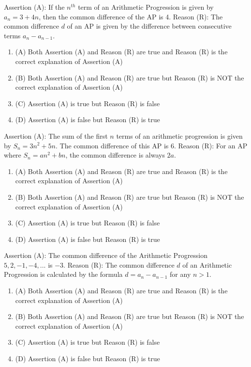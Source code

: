 \documentclass[12pt,a4paper]{exam}
\begin{document}
\begin{questions}
\question[1] Assertion (A): If the $n^{th}$ term of an Arithmetic Progression is given by $a_n = 3 + 4n$, then the common difference of the AP is 4. 
Reason (R): The common difference $d$ of an AP is given by the difference between consecutive terms $a_n - a_{n-1}$.
\begin{enumerate}[label=(\Alph*)]
  \item (A) Both Assertion (A) and Reason (R) are true and Reason (R) is the correct explanation of Assertion (A)
  \item (B) Both Assertion (A) and Reason (R) are true but Reason (R) is NOT the correct explanation of Assertion (A)
  \item (C) Assertion (A) is true but Reason (R) is false
  \item (D) Assertion (A) is false but Reason (R) is true
\end{enumerate}
\vspace{0.15cm}

\question[1] Assertion (A): The sum of the first $n$ terms of an arithmetic progression is given by $S_n = 3n^2 + 5n$. The common difference of this AP is 6.
Reason (R): For an AP where $S_n = an^2 + bn$, the common difference is always $2a$.
\begin{enumerate}[label=(\Alph*)]
  \item (A) Both Assertion (A) and Reason (R) are true and Reason (R) is the correct explanation of Assertion (A)
  \item (B) Both Assertion (A) and Reason (R) are true but Reason (R) is NOT the correct explanation of Assertion (A)
  \item (C) Assertion (A) is true but Reason (R) is false
  \item (D) Assertion (A) is false but Reason (R) is true
\end{enumerate}
\vspace{0.15cm}

\question[1] Assertion (A): The common difference of the Arithmetic Progression $5, 2, -1, -4, ...$ is $-3$. 
Reason (R): The common difference $d$ of an Arithmetic Progression is calculated by the formula $d = a_{n} - a_{n-1}$ for any $n > 1$.
\begin{enumerate}[label=(\Alph*)]
  \item (A) Both Assertion (A) and Reason (R) are true and Reason (R) is the correct explanation of Assertion (A)
  \item (B) Both Assertion (A) and Reason (R) are true but Reason (R) is NOT the correct explanation of Assertion (A)
  \item (C) Assertion (A) is true but Reason (R) is false
  \item (D) Assertion (A) is false but Reason (R) is true
\end{enumerate}
\vspace{0.15cm}


\end{questions}
\end{document}

